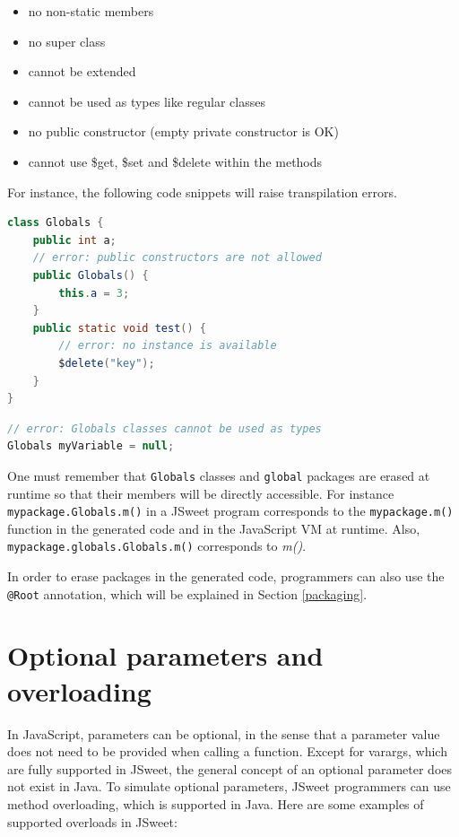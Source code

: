 \documentclass[a4paper]{report}
\begin{document}
\begin{itemize}
\item no non-static members
\item no super class
\item cannot be extended
\item cannot be used as types like regular classes
\item no public constructor (empty private constructor is OK)
\item cannot use \$get, \$set and \$delete within the methods
\end{itemize}

For instance, the following code snippets will raise transpilation errors.

\begin{lstlisting}[language=Java]
class Globals {
	public int a;
	// error: public constructors are not allowed
	public Globals() {
		this.a = 3;
	}
	public static void test() {
		// error: no instance is available
		$delete("key");
	}
}
\end{lstlisting}

\begin{lstlisting}[language=Java]
// error: Globals classes cannot be used as types
Globals myVariable = null;
\end{lstlisting}

One must remember that \texttt{Globals} classes and \texttt{global} packages are erased at runtime so that their members will be directly accessible. For instance \texttt{mypackage.Globals.m()} in a JSweet program corresponds to the \texttt{mypackage.m()} function in the generated code and in the JavaScript VM at runtime. Also, \texttt{mypackage.globals.Globals.m()} corresponds to \emph{m()}.

In order to erase packages in the generated code, programmers can also use the \texttt{@Root} annotation, which will be explained in Section \ref{packaging}.

\section{Optional parameters and overloading} 
\label{optional-parameters}

In JavaScript, parameters can be optional, in the sense that a parameter value does not need to be provided when calling a function. Except for varargs, which are fully supported in JSweet, the general concept of an optional parameter does not exist in Java. To simulate optional parameters, JSweet programmers can use method overloading, which is supported in Java. Here are some examples of supported overloads in JSweet:
\end{document}
